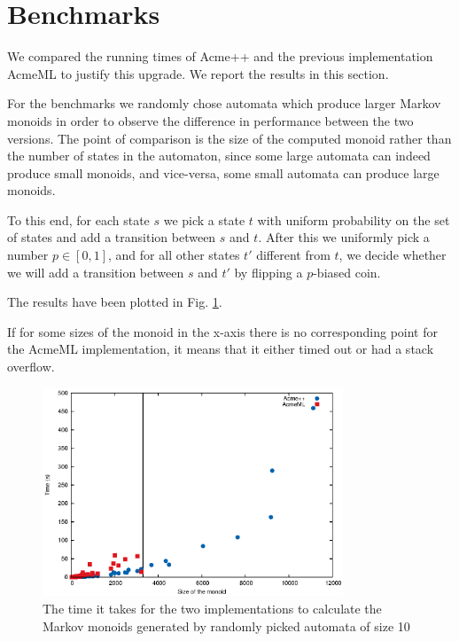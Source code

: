 \section{Benchmarks}
We compared the running times of Acme++ and the previous
implementation AcmeML to justify this upgrade. We report the results
in this section.

For the benchmarks we randomly chose automata which produce larger
Markov monoids in order to observe the difference in performance
between the two versions. The point of comparison is the size of the
computed monoid rather than the number of states in the automaton,
since some large automata can indeed produce small monoids, and
vice-versa, some small automata can produce large monoids.

To this end, for each state $s$ we pick a state $t$ with uniform
probability on the set of states and add a transition between $s$ and
$t$. After this we uniformly pick a number $p\in[0,1]$, and for all
other states $t'$ different from $t$, we decide whether we will add a
transition between $s$ and $t'$ by flipping a $p$-biased coin.

The results have been plotted in Fig. \ref{bench1}. 

If for some sizes of the monoid in the x-axis there is no
corresponding point for the AcmeML implementation, it means that it
either timed out or had a stack overflow.

\begin{figure}[h!]
  \label{bench1}
  \begin{center}
    \includegraphics[width=0.8\textwidth]{graph/lines}
    \caption{The time it takes for the two implementations to
      calculate the Markov monoids generated by randomly picked
      automata of size 10}
  \end{center}  
\end{figure}

